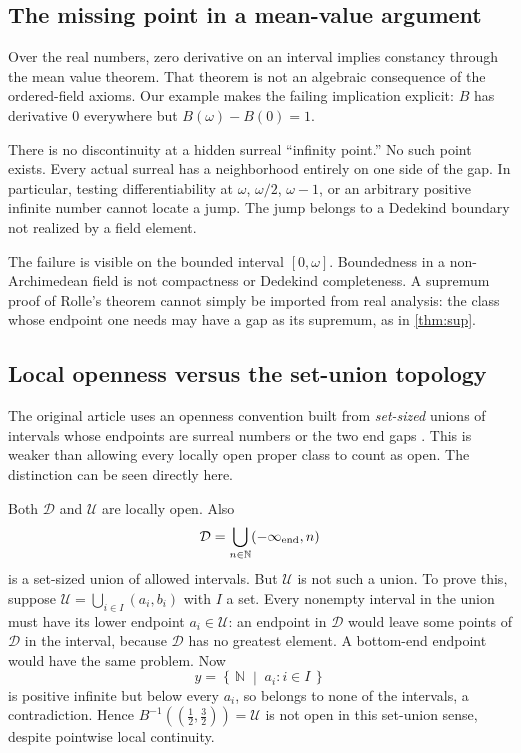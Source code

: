 \documentclass[11pt,letterpaper]{article}
\numberwithin{equation}{section}
\theoremstyle{definition}
\theoremstyle{remark}
\newcommand{\N}{\mathbb{N}}
\newcommand{\U}{\mathcal{U}}
\newcommand{\D}{\mathcal{D}}
\newcommand{\cut}[2]{\left\{\,#1\;\middle|\;#2\,\right\}}
\newcommand{\source}[2]{\cite[#1]{#2}}
\begin{document}
\subsection{The missing point in a mean-value argument}
Over the real numbers, zero derivative on an interval implies constancy
through the mean value theorem. That theorem is not an algebraic
consequence of the ordered-field axioms. Our example makes the failing
implication explicit: $B$ has derivative $0$ everywhere but
$B(\omega)-B(0)=1$.

There is no discontinuity at a hidden surreal ``infinity point.'' No such
point exists. Every actual surreal has a neighborhood entirely on one
side of the gap. In particular, testing differentiability at $\omega$,
$\omega/2$, $\omega-1$, or an arbitrary positive infinite number cannot
locate a jump. The jump belongs to a Dedekind boundary not realized by a
field element.

The failure is visible on the bounded interval $[0,\omega]$. Boundedness
in a non-Archimedean field is not compactness or Dedekind completeness.
A supremum proof of Rolle's theorem cannot simply be imported from real
analysis: the class whose endpoint one needs may have a gap as its
supremum, as in \cref{thm:sup}.

\subsection{Local openness versus the set-union topology}
The original article uses an openness convention built from
\emph{set-sized} unions of intervals whose endpoints are surreal numbers
or the two end gaps \source{Definition~7}{RSS}. This is weaker than
allowing every locally open proper class to count as open. The distinction
can be seen directly here.

Both $\D$ and $\U$ are locally open. Also
\[
 \D=\bigcup_{n\in\N}(-\infty_{\rm end},n)
\]
is a set-sized union of allowed intervals. But $\U$ is not such a union.
To prove this, suppose $\U=\bigcup_{i\in I}(a_i,b_i)$ with $I$ a set.
Every nonempty interval in the union must have its lower endpoint
$a_i\in\U$: an endpoint in $\D$ would leave some points of $\D$ in the
interval, because $\D$ has no greatest element. A bottom-end endpoint
would have the same problem. Now
\[
 y=\cut{\N}{a_i:i\in I}
\]
is positive infinite but below every $a_i$, so belongs to none of the
intervals, a contradiction. Hence $B^{-1}((\tfrac12,\tfrac32))=\U$ is
not open in this set-union sense, despite pointwise local continuity.
\end{document}
